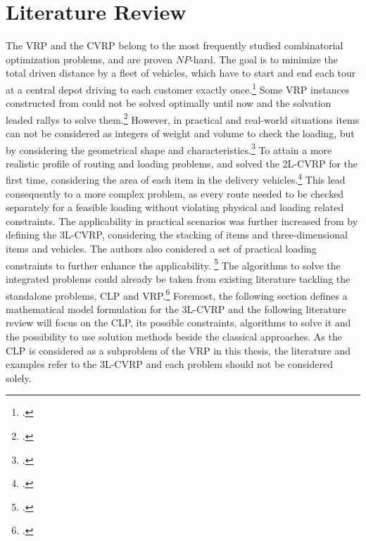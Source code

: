 \chapter{Literature Review}
\label{chap:literature_review}

The \gls{VRP} and the \gls{CVRP} belong to the most frequently studied combinatorial
optimization problems, and are proven $NP$-hard. The goal is to minimize the total driven distance
by a fleet of vehicles, which have to start and end each tour at a central depot driving to each
customer exactly once.\footcite[cf.][p. 1]{gendreau_tabu_2008} Some \gls{VRP}
instances constructed from \cite{solomon_algorithms_1987} could not be solved optimally until now and the
solvation leaded rallys to solve them.\footcite[cf.][]{solomon_algorithms_1987} However,
in practical and real-world situations items can not be considered as integers of weight
and volume to check the loading, but by considering the geometrical shape and characteristics.\footcite[cf.][p. 1]{gendreau_tabu_2008}
To attain a more realistic profile of routing and loading problems, \cite{iori_exact_2004} and \cite{gendreau_tabu_2008}
solved the \gls{2L-CVRP} for the first time, considering the area of each item in
the delivery vehicles.\footcites(cf.)(){iori_exact_2004}{gendreau_tabu_2008}
This lead consequently to a more complex problem, as every route needed to be checked separately for
a feasible loading without violating physical and loading related constraints.
The applicability in practical scenarios was further increased from \cite{gendreau_tabu_2006} by defining
the \gls{3L-CVRP}, considering the stacking of items and three-dimensional items and vehicles. The authors
also conidered a set of practical loading constraints to further enhance the applicability. \footcite[cf.][]{gendreau_tabu_2006}
The algorithms to solve the integrated problems could already be taken from existing literature tackling the standalone
problems, \gls{CLP} and \gls{VRP}.\footcite[cf.][]{pisinger_heuristics_2002} Foremost, the following section defines
a mathematical model formulation for the \gls{3L-CVRP} and the following literature review will focus
on the \gls{CLP}, its possible constraints, algorithms to solve it and the possibility to use solution
methods beside the classical approaches. As the \gls{CLP} is considered as a subproblem of the \gls{VRP}
in this thesis, the literature and examples refer to the \gls{3L-CVRP} and each problem should not be
considered solely.




